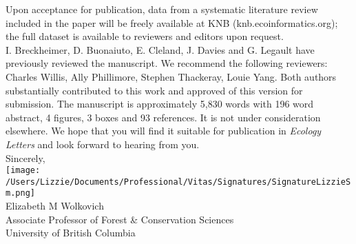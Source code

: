 \documentclass[12pt,a4paper]{letter}
\begin{document}
\begin{letter}{}
Upon acceptance for publication, data from a systematic literature review included in the paper will be freely available at KNB (knb.ecoinformatics.org); the full dataset is available to reviewers and editors upon request. %
\vspace{1.5ex}\\
I. Breckheimer, D. Buonaiuto, E. Cleland, J. Davies and G. Legault have previously reviewed the manuscript. We recommend the following reviewers: Charles Willis, Ally Phillimore, Stephen Thackeray, Louie Yang.  Both authors substantially contributed to this work and approved of this version for submission. The manuscript is approximately 5,830 words with 196 word abstract, 4 figures, 3 boxes and 93 references. It is not under consideration elsewhere. We hope that you will find it suitable for publication in \emph{Ecology Letters} and look forward to hearing from you.
\vspace{1.5ex}\\
Sincerely,\\

\texttt{[image: /Users/Lizzie/Documents/Professional/Vitas/Signatures/SignatureLizzieSm.png]} \\

Elizabeth M Wolkovich\\
Associate Professor of Forest \& Conservation Sciences\\ 
University of British Columbia
\end{letter}
\end{document}
